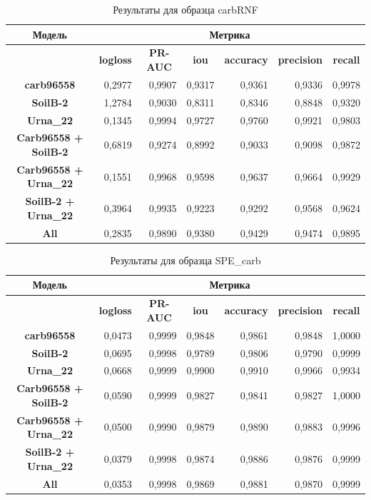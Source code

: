 \documentclass[14pt, a4paper, oneside, bold]{extarticle}
\begin{document}
\begin{table}[htbp]
\small
\begin{tabular}{|c|r|r|r|r|r|r|}
\hline
\textbf{Модель} & \multicolumn{ 6}{c|}{\textbf{Метрика}} \\ \hline
\textbf{} & \multicolumn{1}{c|}{\textbf{logloss}} & \multicolumn{1}{c|}{\textbf{PR-AUC}} & \multicolumn{1}{c|}{\textbf{iou}} & \multicolumn{1}{c|}{\textbf{accuracy}} & \multicolumn{1}{c|}{\textbf{precision}} & \multicolumn{1}{c|}{\textbf{recall}} \\ \hline
\textbf{carb96558} & 0,2977 & 0,9907 & 0,9317 & 0,9361 & 0,9336 & 0,9978 \\ \hline
\textbf{SoilB-2} & 1,2784 & 0,9030 & 0,8311 & 0,8346 & 0,8848 & 0,9320 \\ \hline
\textbf{Urna\_22} & 0,1345 & 0,9994 & 0,9727 & 0,9760 & 0,9921 & 0,9803 \\ \hline
\textbf{Carb96558 + SoilB-2} & 0,6819 & 0,9274 & 0,8992 & 0,9033 & 0,9098 & 0,9872 \\ \hline
\textbf{Carb96558 + Urna\_22} & 0,1551 & 0,9968 & 0,9598 & 0,9637 & 0,9664 & 0,9929 \\ \hline
\textbf{SoilB-2 + Urna\_22} & 0,3964 & 0,9935 & 0,9223 & 0,9292 & 0,9568 & 0,9624 \\ \hline
\textbf{All} & 0,2835 & 0,9890 & 0,9380 & 0,9429 & 0,9474 & 0,9895 \\ \hline
\end{tabular}
\caption{Результаты для образца carbRNF}
\label{carbRNF}
\end{table}

\begin{table}[htbp]
\small
\begin{tabular}{|c|r|r|r|r|r|r|}
\hline
\textbf{Модель} & \multicolumn{ 6}{c|}{\textbf{Метрика}} \\ \hline
\textbf{} & \multicolumn{1}{c|}{\textbf{logloss}} & \multicolumn{1}{c|}{\textbf{PR-AUC}} & \multicolumn{1}{c|}{\textbf{iou}} & \multicolumn{1}{c|}{\textbf{accuracy}} & \multicolumn{1}{c|}{\textbf{precision}} & \multicolumn{1}{c|}{\textbf{recall}} \\ \hline
\textbf{carb96558} & 0,0473 & 0,9999 & 0,9848 & 0,9861 & 0,9848 & 1,0000 \\ \hline
\textbf{SoilB-2} & 0,0695 & 0,9998 & 0,9789 & 0,9806 & 0,9790 & 0,9999 \\ \hline
\textbf{Urna\_22} & 0,0668 & 0,9999 & 0,9900 & 0,9910 & 0,9966 & 0,9934 \\ \hline
\textbf{Carb96558 + SoilB-2} & 0,0590 & 0,9999 & 0,9827 & 0,9841 & 0,9827 & 1,0000 \\ \hline
\textbf{Carb96558 + Urna\_22} & 0,0500 & 0,9990 & 0,9879 & 0,9890 & 0,9883 & 0,9996 \\ \hline
\textbf{SoilB-2 + Urna\_22} & 0,0379 & 0,9998 & 0,9874 & 0,9886 & 0,9876 & 0,9999 \\ \hline
\textbf{All} & 0,0353 & 0,9998 & 0,9869 & 0,9881 & 0,9870 & 0,9999 \\ \hline
\end{tabular}
\caption{Результаты для образца SPE\_carb}
\label{SPE_carb}
\end{table}
\end{document}
